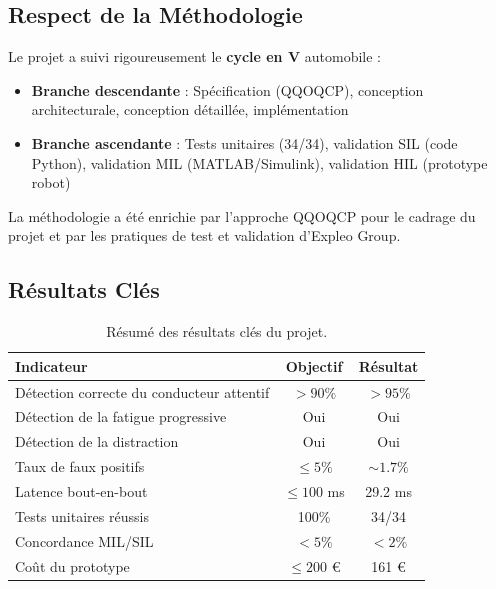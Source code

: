\subsection{Respect de la Méthodologie}

Le projet a suivi rigoureusement le \textbf{cycle en V} automobile :

\begin{itemize}
    \item \textbf{Branche descendante} : Spécification (QQOQCP), conception architecturale, conception détaillée, implémentation
    \item \textbf{Branche ascendante} : Tests unitaires (34/34), validation SIL (code Python), validation MIL (MATLAB/Simulink), validation HIL (prototype robot)
\end{itemize}

La méthodologie a été enrichie par l'approche QQOQCP pour le cadrage du projet et par les pratiques de test et validation d'Expleo Group.

\subsection{Résultats Clés}

\begin{table}[H]
\centering
\caption{Résumé des résultats clés du projet.}
\label{tab:key_results}
\renewcommand{\arraystretch}{1.4}
\begin{tabularx}{\textwidth}{|X|c|c|}
\hline
\rowcolor{stellantisblue!15}
\textbf{Indicateur} & \textbf{Objectif} & \textbf{Résultat} \\
\hline
Détection correcte du conducteur attentif & $> 90\%$ & \cellcolor{green!20} $> 95\%$ \\
\hline
Détection de la fatigue progressive & Oui & \cellcolor{green!20} Oui \\
\hline
Détection de la distraction & Oui & \cellcolor{green!20} Oui \\
\hline
Taux de faux positifs & $\leq 5\%$ & \cellcolor{green!20} $\sim 1.7\%$ \\
\hline
Latence bout-en-bout & $\leq 100$ ms & \cellcolor{green!20} 29.2 ms \\
\hline
Tests unitaires réussis & 100\% & \cellcolor{green!20} 34/34 \\
\hline
Concordance MIL/SIL & $< 5\%$ & \cellcolor{green!20} $< 2\%$ \\
\hline
Coût du prototype & $\leq 200$ € & \cellcolor{green!20} 161 € \\
\hline
\end{tabularx}
\end{table}

